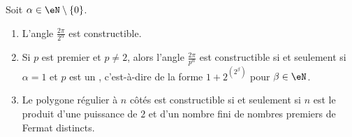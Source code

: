 \begin{theorem}      \label{ThoTWAooEsLjJu}
	Soit \( \alpha\in \eN\setminus\{ 0 \}\).
	\begin{enumerate}
		\item   \label{ItemFSEooONDFrSi}
		      L'angle \( \frac{ 2\pi }{ 2^{\alpha} } \) est constructible.
		\item   \label{ItemFSEooONDFrSii}
		      Si \( p\) est premier et \( p\neq 2\), alors l'angle \( \frac{ 2\pi }{ p^{\alpha} } \) est constructible si et seulement si \( \alpha=1\) et \( p\) est un , c'est-à-dire de la forme \( 1+2^{(2^{\beta})}\) pour \( \beta\in \eN\).
		\item   \label{ItemFSEooONDFrSiii}
		      Le polygone régulier à \( n\) côtés est constructible si et seulement si \( n \) est le produit d'une puissance de \( 2\) et d'un nombre fini de nombres premiers de Fermat distincts.
	\end{enumerate}
\end{theorem}

